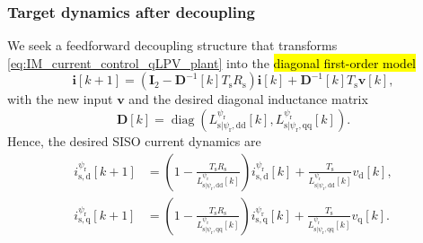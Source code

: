 \begin{frame}
    \frametitle{Target dynamics after decoupling}
    We seek a feedforward decoupling structure that transforms \eqref{eq:IM_current_control_qLPV_plant} into the \hl{diagonal first-order model}
    \begin{equation}
        \bm{i}[k+1]=\left(\bm{I}_2-\bm{D}^{-1}[k]T_\mathrm{s}R_\mathrm{s}\right)\bm{i}[k]
        +\bm{D}^{-1}[k]T_\mathrm{s}\bm{v}[k],
        \label{eq:IM_target_diag_model}
    \end{equation}\pause%
    with the new input $\bm{v}$ and the desired diagonal inductance matrix
    \begin{equation}
        \bm{D}[k]=\operatorname{diag}\left(L^{\psi_\mathrm{r}}_{\mathrm{s}|\psi_\mathrm{r},\mathrm{dd}}[k],
        L^{\psi_\mathrm{r}}_{\mathrm{s}|\psi_\mathrm{r},\mathrm{qq}}[k]\right).
        \label{eq:IM_target_diag_inductance}
    \end{equation}\pause%
    Hence, the desired SISO current dynamics are
    \begin{equation}
        \begin{split}
            i^{\psi_\mathrm{r}}_{\mathrm{s,d}}[k+1]
             & =\left(1-\frac{T_\mathrm{s}R_\mathrm{s}}{L^{\psi_\mathrm{r}}_{\mathrm{s}|\psi_\mathrm{r},\mathrm{dd}}[k]}\right)i^{\psi_\mathrm{r}}_{\mathrm{s,d}}[k]
            +\frac{T_\mathrm{s}}{L^{\psi_\mathrm{r}}_{\mathrm{s}|\psi_\mathrm{r},\mathrm{dd}}[k]}v_\mathrm{d}[k],                                                    \\
            i^{\psi_\mathrm{r}}_{\mathrm{s,q}}[k+1]
             & =\left(1-\frac{T_\mathrm{s}R_\mathrm{s}}{L^{\psi_\mathrm{r}}_{\mathrm{s}|\psi_\mathrm{r},\mathrm{qq}}[k]}\right)i^{\psi_\mathrm{r}}_{\mathrm{s,q}}[k]
            +\frac{T_\mathrm{s}}{L^{\psi_\mathrm{r}}_{\mathrm{s}|\psi_\mathrm{r},\mathrm{qq}}[k]}v_\mathrm{q}[k].
        \end{split}
    \end{equation}
\end{frame}

